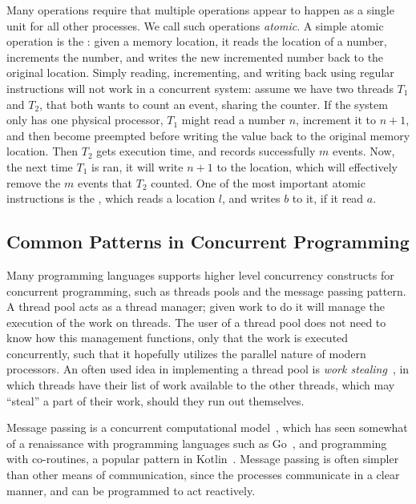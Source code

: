 Many operations require that multiple operations appear to happen as a single unit for all other
processes. We call such operations \emph{atomic}. A simple atomic operation is the
: given a memory location, it reads the location of a number, increments the
number, and writes the new incremented number back to the original location.  Simply reading,
incrementing, and writing back using regular instructions will not work in a concurrent system:
assume we have two threads $T_1$ and $T_2$, that both wants to count an event, sharing the counter.
If the system only has one physical processor, $T_1$ might read a number $n$, increment it to
$n+1$, and then become preempted before writing the value back to the original memory location.
Then $T_2$ gets execution time, and records successfully $m$ events. Now, the next time $T_1$ is
ran, it will write $n+1$ to the location, which will effectively remove the $m$ events that $T_2$
counted. One of the most important atomic instructions is the ,
which reads a location $l$, and writes $b$ to it, if it read $a$.

\subsection{Common Patterns in Concurrent Programming\label{sec:common-patterns}}

Many programming languages supports higher level concurrency constructs for concurrent programming,
such as threads pools and the message passing pattern. A thread pool acts as a thread manager;
given work to do it will manage the execution of the work on threads. The user of a thread pool
does not need to know how this management functions, only that the work is executed concurrently,
such that it hopefully utilizes the parallel nature of modern processors.  An often used idea in
implementing a thread pool is \emph{work stealing}~\cite{blumofe1999scheduling}, in which threads
have their list of work available to the other threads, which may ``steal'' a part of their work,
should they run out themselves.

Message passing is a concurrent computational model~\cite{hewitt1973session}, which has seen
somewhat of a renaissance with programming languages such as Go~\cite{go}, and programming with
co-routines, a popular pattern in Kotlin~\cite{kotlin}. Message passing is often simpler than other
means of communication, since the processes communicate in a clear manner, and can be programmed to
act reactively.

